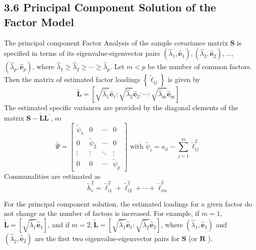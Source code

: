 \documentclass[12]{article}
\begin{document}
\subsection*{3.6 Principal Component Solution of the Factor Model}

The principal component Factor Analysis of the sample covariance matrix $\mathbf{S}$ is specified in terms of its eigenvalue-eigenvector pairs $\left(\hat{\lambda}_1, \hat{\mathbf{e}}_1\right),\left(\hat{\lambda}_2, \hat{\mathbf{e}}_2\right), \ldots$, $\left(\hat{\lambda}_p, \hat{\mathbf{e}}_p\right)$, where $\hat{\lambda}_1 \geq \hat{\lambda}_2 \geq \cdots \geq \hat{\lambda}_p$. Let $m<p$ be the number of common factors. Then the matrix of estimated factor loadings $\left\{\tilde{\ell}_{i j}\right\}$ is given by
\begin{equation}
	\tilde{\mathbf{L}}=\left[\sqrt{\hat{\lambda}_1} \hat{\mathbf{e}}_1: \sqrt{\hat{\lambda}_2} \hat{\mathbf{e}}_2: \cdots: \sqrt{\hat{\lambda}_{\mathrm{m}}} \hat{\mathbf{e}}_{\mathrm{m}}\right]
\end{equation}
The estimated specific variances are provided by the diagonal elements of the matrix $\mathbf{S}-\widetilde{\mathbf{L}} \mathbf{L}^{\prime}$, so
\begin{equation}
	\widetilde{\Psi}=\left[\begin{array}{cccc}
		\widetilde{\psi}_1 & 0 & \cdots & 0 \\
		0 & \widetilde{\psi}_2 & \cdots & 0 \\
		\vdots & \vdots & \ddots & \vdots \\
		0 & 0 & \cdots & \widetilde{\psi}_p
	\end{array}\right] \text { with } \widetilde{\psi}_i=s_{i i}-\sum_{j=1}^m \tilde{\ell}_{i j}^2
\end{equation}
Communalities are estimated as
\begin{equation}
	\widetilde{h}_i^2=\tilde{\ell}_{i 1}^2+\tilde{\ell}_{i 2}^2+\cdots+\tilde{\ell}_{i m}^2
\end{equation}

\noindent For the principal component solution, the estimated loadings for a given factor do not change as the number of factors is increased. For example, if $m=1$, $\tilde{\mathbf{L}}=\left[\sqrt{\hat{\lambda}_1} \hat{\mathbf{e}}_1\right]$, and if $m=2, \tilde{\mathbf{L}}=\left[\sqrt{\hat{\lambda}_1} \hat{\mathbf{e}}_1: \sqrt{\hat{\lambda}_2} \hat{\mathbf{e}}_2\right]$, where $\left(\hat{\lambda}_1, \hat{\mathbf{e}}_1\right)$ and $\left(\hat{\lambda}_2, \hat{\mathbf{e}}_2\right)$ are the first two eigenvalue-eigenvector pairs for $\mathbf{S}$ (or $\mathbf{R}$ ).
\end{document}
